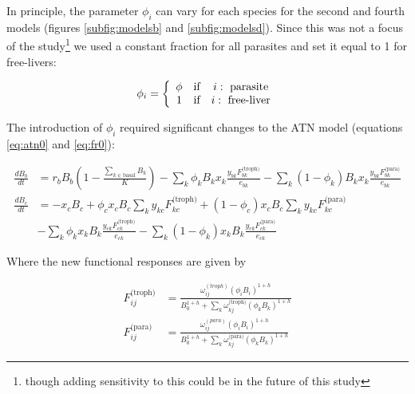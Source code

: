 \documentclass[11pt]{amsart}
\begin{document}
In principle, the parameter $\phi_i$ can vary for each species for the second and fourth models (figures \ref{subfig:modelsb} and \ref{subfig:modelsd}).  Since this was not a focus of the study\footnote{though adding sensitivity to this could be in the future of this study} we used a constant fraction for all parasites and set it equal to 1 for free-livers:

\begin{equation}
\phi_i = 
\left\{
\begin{array}{c c c}
\phi & \text{if} & i:\text{ parasite}\\
1 & \text{if} & i:\text{ free-liver}\\
\end{array}\right.\label{eq:phi}
\end{equation}

The introduction of $\phi_i$ required significant changes to the ATN model (equations \eqref{eq:atn0} and \eqref{eq:fr0}):


\begin{subequations}\label{eq:atn1}
\begin{align}
\frac{dB_{b}}{dt} &= r_bB_b\left(1-\frac{\sum_{k\in\text{basal}}B_k}{K}\right) - \sum_k\phi_kB_kx_k\frac{y_{bk}F_{bk}^\text{(troph)}}{e_{bk}} - \sum_k(1-\phi_k)B_kx_k\frac{y_{bk}F^\text{(para)}_{bk}}{e_{bk}}\label{subeq:basal1} \\ 
\frac{dB_{c}}{dt} &= -x_cB_c + \phi_cx_cB_c\sum_ky_{kc}F^\text{(troph)}_{kc} + (1-\phi_c)x_cB_c\sum_ky_{kc}F^\text{(para)}_{kc} \label{subeq:con1}\\ 
& - \sum_k \phi_kx_kB_k\frac{y_{ck}F^\text{(troph)}_{ck}}{e_{ck}} - \sum_k (1-\phi_k)x_kB_k\frac{y_{ck}F^\text{(para)}_{ck}}{e_{ck}}\nonumber
\end{align}
\end{subequations}

Where the new functional responses are given by 

\begin{subequations}\label{eq:fr1}
\begin{align}F_{ij}^\text{(troph)} &= \frac{\omega_{ij}^{(troph)}(\phi_iB_i)^{1+h}}{B_0^{1+h} + \sum_k\omega^\text{(troph)}_{kj}(\phi_kB_k)^{1+h}} \label{subeq:fr1troph}\\
F_{ij}^\text{(para)} &= \frac{\omega_{ij}^{(para)}(\phi_iB_i)^{1+h}}{B_0^{1+h} + \sum_k\omega^\text{(para)}_{kj}(\phi_kB_k)^{1+h}} \label{subeq:fr1para}
\end{align}
\end{subequations}
\end{document}
